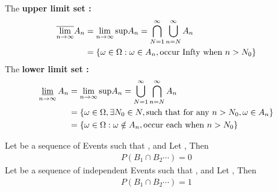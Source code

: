 \begin{definition}
    The {\bf upper limit set :} 
    \begin{align}
        \overline{\lim_{n\to\infty}}{A_n} & =\lim_{n\to\infty}{\mathrm{sup}A_n} = \bigcap_{N=1}^\infty{\bigcup_{n=N}^\infty{A_n}} \notag\\
                                          & = \{\omega\in \Omega: \omega\in A_n, \mbox{\rm occur Infty when }n>N_0\} 
    \end{align}
    The {\bf lower limit set :} 
    \begin{align}
        \mathop{ \underline{\lim}}\limits_{n\to\infty}{A_n} & =\lim_{n\to\infty}{\mathrm{sup}A_n} = \bigcup_{N=1}^\infty{\bigcap_{n=N}^\infty{A_n}} \notag\\
                              & = \{\omega\in \Omega, \exists N_0\in N, \mbox{\rm such that for any } n>N_0, \omega\in A_n\} \notag\\            
                    & = \{\omega\in \Omega: \omega\notin A_n, \mbox{\rm occur each when }n>N_0\} 
    \end{align}
    

\end{definition}

\begin{lemma}
    Let  be a sequence of Events such that , and Let 
    , Then
    \begin{align*}
        P(B_1\cap B_2\cdots) = 0
    \end{align*}
    Let  be a sequence of independent Events such that , and Let 
    , Then
    \begin{align*}
        P(B_1\cap B_2\cdots) = 1
    \end{align*}
\end{lemma}

